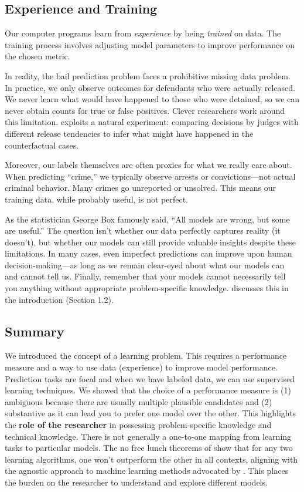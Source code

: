 \subsection{Experience and Training}

Our computer programs learn from \textit{experience} by being \textit{trained} on data. The training process involves adjusting model parameters to improve performance on the chosen metric.

In reality, the bail prediction problem faces a prohibitive missing data problem. In practice, we only observe outcomes for defendants who were actually released. We never learn what would have happened to those who were detained, so we can never obtain counts for true or false positives. Clever researchers work around this limitation. \cite{kleinberg2018human} exploits a natural experiment: comparing decisions by judges with different release tendencies to infer what might have happened in the counterfactual cases.

Moreover, our labels themselves are often proxies for what we really care about. When predicting ``crime,'' we typically observe arrests or convictions—not actual criminal behavior. Many crimes go unreported or unsolved. This means our training data, while probably useful, is not perfect.

As the statistician George Box famously said, ``All models are wrong, but some are useful.'' The question isn't whether our data perfectly captures reality (it doesn't), but whether our models can still provide valuable insights despite these limitations. In many cases, even imperfect predictions can improve upon human decision-making—as long as we remain clear-eyed about what our models can and cannot tell us. Finally, remember that your models cannot necessarily tell you anything without appropriate problem-specific knowledge. \cite{kuhn2013applied} discusses this in the introduction (Section 1.2).

\subsection{Summary}

We introduced the concept of a learning problem. This requires a performance measure and a way to use data (experience) to improve model performance. Prediction tasks are focal and when we have labeled data, we can use supervised learning techniques. We showed that the choice of a performance measure is (1) ambiguous because there are usually multiple plausible candidates and (2) substantive as it can lead you to prefer one model over the other. This highlights the \textbf{role of the researcher} in possessing problem-specific knowledge and technical knowledge. There is not generally a one-to-one mapping from learning tasks to particular models. The no free lunch theorems of \cite{wolpert1996lack} show that for any two learning algorithms, one won't outperform the other in all contexts, aligning with the agnostic approach to machine learning methods advocated by \cite{grimmer2021machine}. This places the burden on the researcher to understand and explore different models.
